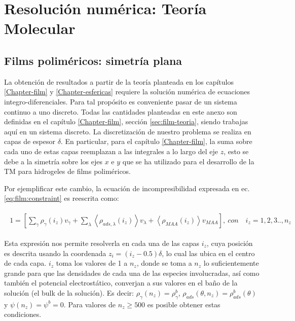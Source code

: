 \chapter{Resoluci\'on num\'erica: Teor\'ia Molecular}\label{sec:film:reso-numerica}


\section{Films polim\'ericos: simetr\'ia plana}

La obtenci\'on de resultados a partir de la teor\'ia planteada en los cap\'itulos \ref{Chapter-film} y \ref{Chapter-esfericas} requiere la soluci\'on num\'erica de ecuaciones integro-diferenciales. Para tal prop\'osito es conveniente pasar de un sistema continuo a uno discreto. 
Todas las cantidades planteadas en este anexo son definidas en el cap\'itulo \ref{Chapter-film}, secci\'on \ref{sec:film-teoria}, siendo trabajas aqu\'i en un sistema discreto.
La discretizaci\'on de nuestro problema se realiza en capas de espesor $\delta$. 
En particular, para el cap\'itulo \ref{Chapter-film}, la suma sobre cada uno de estas capas reemplazan a las integrales a lo largo del eje $z$, esto se debe a la simetr\'ia sobre los ejes $x$ e $y$ que se ha utilizado para el desarrollo de la TM para hidrogeles de films polim\'ericos.


Por ejemplificar este cambio, la ecuaci\'on de incompresibilidad expresada en ec. \ref{eq:film:constraint} es reescrita como:


\begin{align}
	\begin{aligned}
		1=  {\left[\sum_{\gamma}\rho_\gamma(i_z) v_\gamma + \sum_\lambda{\left<\rho_{ads,\lambda}(i_z)\right>v_\lambda} + \left<\rho_{MAA}(i_z)\right>v_{MAA} \right]},~ con \quad  i_z =1,2,3.., n_z
	\end{aligned}
	\label{eq:film:discreto-constraint}
\end{align}

Esta expresi\'on nos permite resolverla en cada una de las capas $i_z$, cuya posici\'on es descrita usando la coordenada $z_i = (i_z -0.5)\delta$, lo cual las ubica en el centro de cada capa. $i_z$ toma los valores de 1 a $n_z$, donde se toma a $n_z$ lo suficientemente grande para que las densidades de cada una de las especies involucradas, as\'i como tambi\'en el potencial electrost\'atico, converjan a sus valores en el ba\~no de la soluci\'on (el bulk de la soluci\'on).
Es decir: $\rho_\gamma(n_z) = \rho^b_\gamma$, $\rho_{ads}(\theta,n_z) = \rho^b_{ads}(\theta)$ y $\psi(n_z) = \psi^b =0$.
Para valores de $n_z \geq 500$ es posible obtener estas condiciones.

